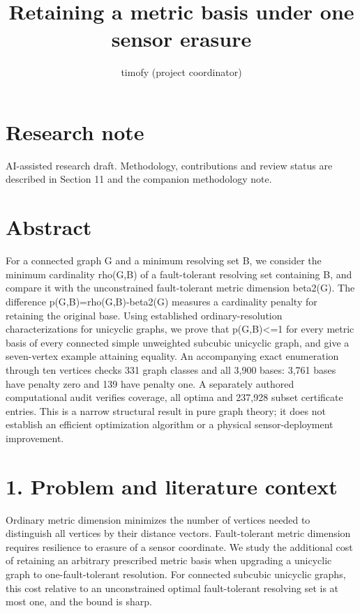 \documentclass[
]{article}
\title{Retaining a metric basis under one sensor erasure}
\author{timofy (project coordinator)}
\date{}
\begin{document}
\maketitle

\section{Research note}\label{research-note}

AI-assisted research draft. Methodology, contributions and review status
are described in Section 11 and the companion methodology note.

\section{Abstract}\label{abstract}

For a connected graph G and a minimum resolving set B, we consider the
minimum cardinality rho(G,B) of a fault-tolerant resolving set
containing B, and compare it with the unconstrained fault-tolerant
metric dimension beta2(G). The difference p(G,B)=rho(G,B)-beta2(G)
measures a cardinality penalty for retaining the original base. Using
established ordinary-resolution characterizations for unicyclic graphs,
we prove that p(G,B)\textless=1 for every metric basis of every
connected simple unweighted subcubic unicyclic graph, and give a
seven-vertex example attaining equality. An accompanying exact
enumeration through ten vertices checks 331 graph classes and all 3,900
bases: 3,761 bases have penalty zero and 139 have penalty one. A
separately authored computational audit verifies coverage, all optima
and 237,928 subset certificate entries. This is a narrow structural
result in pure graph theory; it does not establish an efficient
optimization algorithm or a physical sensor-deployment improvement.

\section{1. Problem and literature
context}\label{problem-and-literature-context}

Ordinary metric dimension minimizes the number of vertices needed to
distinguish all vertices by their distance vectors. Fault-tolerant
metric dimension requires resilience to erasure of a sensor coordinate.
We study the additional cost of retaining an arbitrary prescribed metric
basis when upgrading a unicyclic graph to one-fault-tolerant resolution.
For connected subcubic unicyclic graphs, this cost relative to an
unconstrained optimal fault-tolerant resolving set is at most one, and
the bound is sharp.
\end{document}
